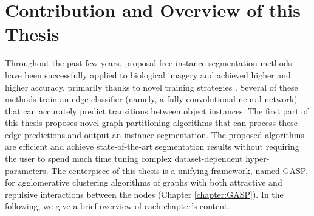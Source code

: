 \newpage
\section{Contribution and Overview of this Thesis}
Throughout the past few years, proposal-free instance segmentation methods have been successfully applied to biological imagery and achieved higher and higher accuracy, primarily thanks to novel training strategies \cite{lee2017superhuman,milletari2016v}. 
Several of these methods train an edge classifier (namely, a fully convolutional neural network) that can accurately predict transitions between object instances. The first part of this thesis proposes novel graph partitioning algorithms that can process these edge predictions and output an instance segmentation. The proposed algorithms are efficient and achieve state-of-the-art segmentation results without requiring the user to spend much time tuning complex dataset-dependent hyper-parameters. The centerpiece of this thesis is a unifying framework, named GASP, for agglomerative clustering algorithms of graphs with both attractive and repulsive interactions between the nodes (Chapter \ref{chapter:GASP}). 
In the following, we give a brief overview of each chapter’s content.
\medskip

